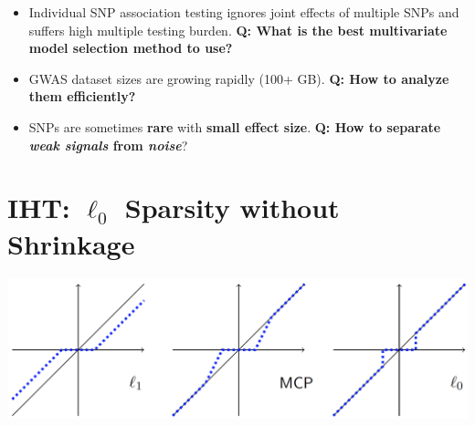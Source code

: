 \documentclass[a0,portrait]{a0poster}
\begin{document}
\begin{multicols}{2}
\large
\begin{itemize}
	\item Individual SNP association testing ignores joint effects of multiple SNPs and suffers high multiple testing burden. \textbf{\color{Green} Q: What is the best multivariate model selection method to use? }
	\item GWAS dataset sizes are growing rapidly (100+ GB). \textbf{\color{Green} Q: How to analyze them efficiently? } \color{black}
	\item SNPs are sometimes \textbf{rare} with \textbf{small effect size}. \color{Green} \textbf{Q: How to separate \textit{weak signals} from \textit{noise}}?  \color{black}
\end{itemize}

\color{Navy} %




\color{Navy} %

\section*{IHT: $\ell_0$ Sparsity without Shrinkage}

\color{Black} %

\begin{center}
\includegraphics[width=0.7\linewidth]{shrinkage.png}
\end{center}


\end{multicols}
\end{document}
